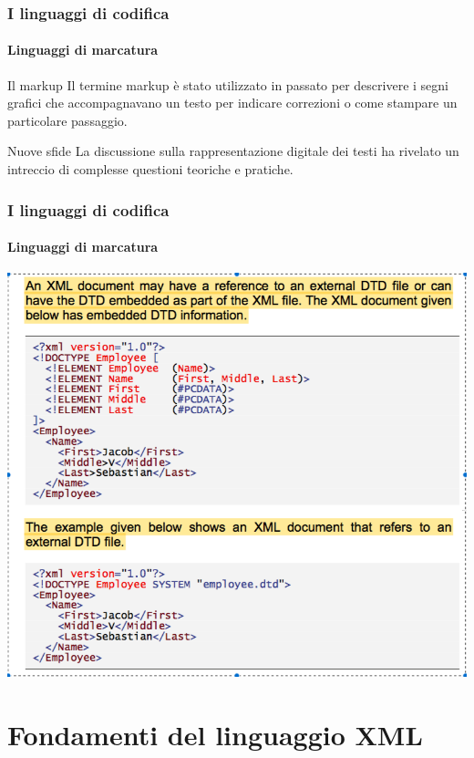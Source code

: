 \documentclass{beamer}
\begin{document}
    
    \begin{frame}
        \frametitle{I linguaggi di codifica}
        \framesubtitle{Linguaggi di marcatura}
        \addtocounter{nframe}{1}
    
        \begin{block}{Il markup}
            Il termine markup è stato utilizzato in passato per descrivere i segni grafici che accompagnavano  un testo per indicare correzioni o come stampare un particolare passaggio.
        \end{block}
    
        \begin{block}{Nuove sfide}
            La discussione sulla rappresentazione digitale dei testi ha rivelato un intreccio di complesse questioni teoriche e pratiche.
        \end{block}
    
    \end{frame}

    \begin{frame}
        \frametitle{I linguaggi di codifica}
        \framesubtitle{Linguaggi di marcatura}
        \addtocounter{nframe}{1}
    
        \begin{center}
            \includegraphics[width=.8\textwidth]{imgs/dtd.png}
        \end{center}
        
    \end{frame}
    
    
    
    \section{Fondamenti del linguaggio XML}
    
\end{document}
